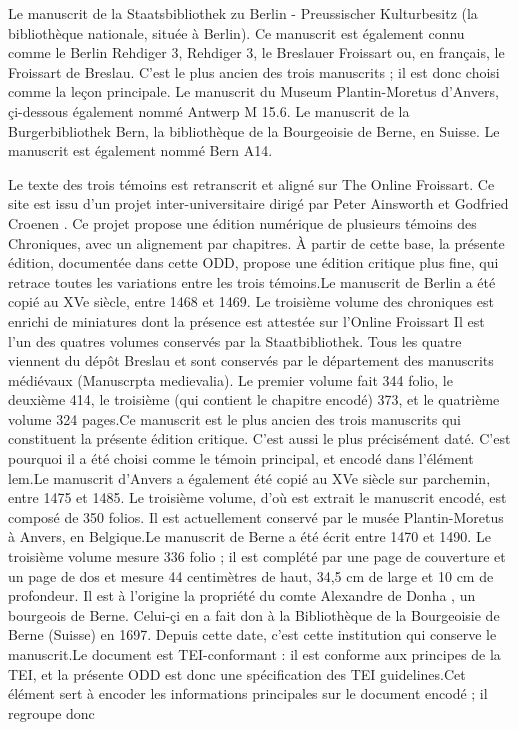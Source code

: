 \documentclass[12pt, a4paper]{article}
\begin{document}
                        Le manuscrit de la Staatsbibliothek zu Berlin - Preussischer Kulturbesitz
                           (la bibliothèque nationale, située à Berlin). Ce manuscrit est également connu comme le Berlin Rehdiger 3, Rehdiger 3, le Breslauer Froissart 
                           ou, en français, le Froissart de Breslau. C'est le plus ancien des trois manuscrits ; il est donc choisi comme la leçon principale.
                        Le manuscrit du Museum Plantin-Moretus d'Anvers, 
                           çi-dessous également nommé Antwerp M 15.6.
                        Le manuscrit de la Burgerbibliothek Bern,
                           la bibliothèque de la Bourgeoisie de Berne, en Suisse. Le manuscrit est également nommé Bern A14.
                     
                  Le texte des trois témoins est retranscrit et aligné sur  The Online Froissart. Ce 
                     site est issu d'un projet inter-universitaire dirigé par  Peter Ainsworth  et  Godfried Croenen . Ce projet propose une édition 
                     numérique de plusieurs témoins des Chroniques, avec un alignement par chapitres. À partir de cette base, la présente édition, documentée dans cette ODD, 
                     propose une édition critique plus fine, qui retrace toutes les variations entre les trois témoins.Le manuscrit de Berlin a été copié au XVe siècle, entre 1468 et 1469. Le troisième volume des chroniques est enrichi de 
                        miniatures dont la présence est attestée sur l'Online Froissart Il est l'un des quatres volumes conservés par la 
                        Staatbibliothek. Tous les quatre viennent du dépôt Breslau et sont conservés par le département des manuscrits médiévaux 
                        (Manuscrpta medievalia). Le premier volume fait 344 folio, le deuxième 414, le troisième (qui contient le chapitre encodé) 373, et le quatrième 
                        volume 324 pages.Ce manuscrit est le plus ancien des trois manuscrits qui constituent la présente édition critique. C'est aussi le plus précisément daté. 
                        C'est pourquoi il a été choisi comme le témoin principal, et encodé dans l'élément lem.Le manuscrit d'Anvers a également été copié au XVe siècle sur parchemin, entre 1475 et 1485. Le troisième volume, d'où est extrait le 
                        manuscrit encodé, est composé de 350 folios. Il est actuellement conservé par le musée Plantin-Moretus à Anvers, en Belgique.Le manuscrit de Berne a été écrit entre 1470 et 1490. Le troisième volume mesure 336 folio ; il est complété par une page de couverture
                        et un page de dos et mesure 44 centimètres de haut, 34,5 cm de large et 10 cm de profondeur. Il est à l'origine la propriété du comte  Alexandre de Donha 
                        , un bourgeois de Berne. Celui-çi en a fait don à la Bibliothèque de la Bourgeoisie de Berne (Suisse) en 1697.
                        Depuis cette date, c'est cette institution qui conserve le manuscrit.Le document est TEI-conformant : il est conforme aux principes de la TEI, et la présente ODD est donc une spécification des TEI guidelines.Cet élément sert à encoder les informations principales sur le document encodé ; il regroupe donc
                        
\end{document}
